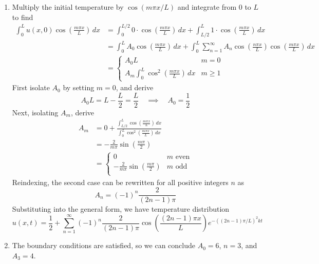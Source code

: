 \documentclass[a4paper]{article}
\begin{document}
\begin{enumerate}[label=(\alph*)]
	\item Multiply the initial temperature by \( \cos\!\left(m \pi x / L\right) \) and integrate from \( 0 \) to \( L \) to find
	\begin{align*}
		\int^{L}_{0} u \!\left( x,0 \right)\cos\!\left(\frac{m \pi x}{L}\right) \, dx & = \int^{L/2}_{0} 0 \cdot \cos\!\left(\frac{m \pi x}{L}\right) \, dx + \int^{L}_{L/2} 1 \cdot \cos\!\left(\frac{m \pi x}{L}\right) \, dx \\										      
& = \int^{L}_{0} A_{0}\cos\!\left(\frac{m \pi x}{L}\right) \, dx + \int^{L}_{0} \sum^{\infty}_{n=1} A_{n}\cos\!\left(\frac{n \pi x}{L}\right)\cos\!\left(\frac{m \pi x}{L}\right) \, dx \\
											      & = \begin{cases}
	\displaystyle{A_{0}L} & m = 0 \\
	\displaystyle{A_{m}\int^{L}_{0} \cos^{2}\!\left(\frac{m \pi x}{L}\right) \, dx} & m \ge 1
    \end{cases}
	\end{align*}
	First isolate \( A_{0} \) by setting \( m = 0 \), and derive
	\[
		A_{0}L = L - \frac{L}{2} = \frac{L}{2} \quad \implies \quad A_{0} = \frac{1}{2} 
	\]
	Next, isolating \( A_{m} \), derive
	\begin{align*}
		A_{m} & = 0 + \frac{\displaystyle{\int^{L}_{L/2} \cos\!\left(\frac{m \pi x}{L}\right) \, dx}}{\displaystyle{\int^{L}_{0} \cos^{2}\!\left(\frac{m \pi x}{L}\right) \, dx}} \\
		 & = -\frac{2}{m \pi}\sin\!\left(\frac{m \pi}{2}\right) \\
		 & = \begin{cases}
		 	0 & m \text{ even} \\
			-\displaystyle{\frac{2}{m \pi}}\sin\!\left(\frac{m \pi}{2}\right) & m \text{ odd} \\
		 \end{cases}
	\end{align*}
	Reindexing, the second case can be rewritten for all positive integers \( n \) as
	\[
		A_{n} = \!\left( -1 \right)^{n}\frac{2}{\!\left( 2n - 1 \right)\pi}  
	\]
	Substituting into the general form, we have temperature distribution
	\[
		u \!\left( x,t \right) = \frac{1}{2} + \sum^{\infty}_{n=1} \!\left( -1 \right)^{n}\frac{2}{\!\left( 2n - 1 \right)\pi} \cos\!\left(\frac{\!\left( 2n - 1 \right)\pi x}{L}\right)e^{-\!\left( \!\left( 2n - 1 \right)\pi / L \right)^{2}kt}
	\]
	\item The boundary conditions are satisfied, so we can conclude \( A_{0} = 6 \), \( n = 3 \), and \( A_{3} = 4 \).

\end{enumerate}
\end{document}
